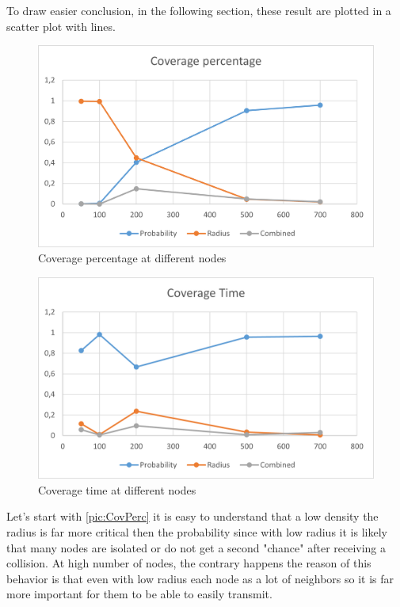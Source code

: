 To draw easier conclusion, in the following section, these result are plotted in a scatter plot with lines.

\begin{figure}[H]\label{pic:CovPerc}
\centering
    \includegraphics[width= 1\textwidth]{./images/CoveragePercentageWithNodes.png}
    \caption{Coverage percentage at different nodes}
    \label{fig:immagine}
\end{figure}


\begin{figure}[H]
\centering
    \includegraphics[width= 1\textwidth]{./images/CoverageTimeWithNodes.png}
    \caption{Coverage time at different nodes}
    \label{fig:immagine}
\end{figure}

Let's start with \ref{pic:CovPerc} it is easy to understand that a low density the radius is far more critical then the probability since with low radius it is likely that many nodes are isolated or do not get a second "chance" after receiving a collision. At high number of nodes, the contrary happens the reason of this behavior is that even with low radius each node as a lot of neighbors so it is far more important for them to be able to easily transmit.

